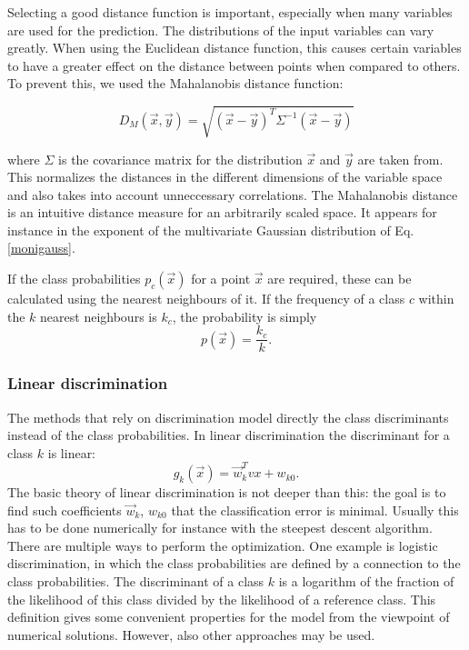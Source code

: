 \documentclass[twoside]{article}
\renewcommand{\v}[1]{\vec{#1}}
\begin{document}
\begin{multicols}{2}
Selecting a good distance function is important, especially when many variables
are used for the prediction. The distributions of the
input variables can vary greatly. When using the Euclidean distance function,
this causes certain variables to have a greater effect on the distance between
points when compared to others. To prevent this, we used the Mahalanobis
distance function\cite[p.~88]{Alpaydin}:

\begin{equation}\label{eq:mahalanobis}
  D_M(\v{x}, \v{y}) = \sqrt{(\v{x}-\v{y})^T \Sigma^{-1} (\v{x}-\v{y})}
\end{equation}

where $\Sigma$ is the covariance matrix for the 
distribution $\v{x}$ and $\v{y}$ are taken from.
This normalizes the distances in the different dimensions of
the variable space and also takes into account unneccessary correlations.
The Mahalanobis distance is an intuitive distance measure for an arbitrarily
scaled space. It appears for instance in the exponent of the multivariate
Gaussian distribution of Eq. \eqref{monigauss}.

If the class probabilities $p_c(\v{x})$ for a point $\v{x}$ are required, these can
be calculated using the nearest neighbours of it. If the frequency of a class $c$
within the $k$ nearest neighbours is $k_c$, the probability is simply
\begin{equation}
 p(\v{x}) = \frac{k_c}{k}.
\end{equation}

\subsubsection{Linear discrimination}\label{method:ldiskr}

The methods that rely on discrimination model directly the class discriminants instead of
the class probabilities. In linear discrimination the discriminant for a class $k$ is linear:
\begin{equation}
 g_k(\v{x}) = \v{w}_k^T v{x} + w_{k0}.
\end{equation}
The basic theory of linear discrimination is not deeper than this: the goal is to find such
coefficients $\v{w}_k$, $w_{k0}$ that the classification error is minimal. Usually this has
to be done numerically for instance with the steepest descent algorithm. There are multiple 
ways to perform the optimization. One example
is logistic discrimination, in which the class probabilities are defined by a connection to the class
probabilities. The discriminant of a class $k$ is a logarithm of the fraction of the likelihood of
this class divided by the likelihood of a reference class. This definition gives some convenient 
properties for the model from the viewpoint of numerical solutions. However, also other
approaches may be used.


\end{multicols}
\end{document}

